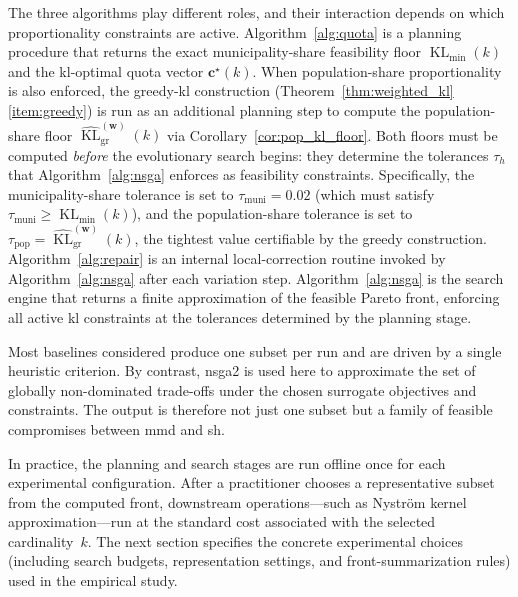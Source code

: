 \documentclass[10pt,journal]{IEEEtran}
\newcommand{\1}{\mathbf{1}}
\newcommand{\bw}{\mathbf{w}}
\newcommand{\bc}{\mathbf{c}}
\DeclareMathOperator{\KL}{KL}
\theoremstyle{ieeethm}
\begin{document}
The three algorithms play different roles, and their interaction depends on which proportionality constraints are active. Algorithm~\ref{alg:quota} is a planning procedure that returns the exact municipality-share feasibility floor $\KL_{\min}(k)$ and the \gls{kl}-optimal quota vector $\bc^\star(k)$. When population-share proportionality is also enforced, the greedy-\gls{kl} construction (Theorem~\ref{thm:weighted_kl}\ref{item:greedy}) is run as an additional planning step to compute the population-share floor $\widehat{\KL}^{(\bw)}_{\mathrm{gr}}(k)$ via Corollary~\ref{cor:pop_kl_floor}. Both floors must be computed \emph{before} the evolutionary search begins: they determine the tolerances $\tau_h$ that Algorithm~\ref{alg:nsga} enforces as feasibility constraints. Specifically, the municipality-share tolerance is set to $\tau_{\mathrm{muni}}=0.02$ (which must satisfy $\tau_{\mathrm{muni}}\ge\KL_{\min}(k)$), and the population-share tolerance is set to $\tau_{\mathrm{pop}}=\widehat{\KL}^{(\bw)}_{\mathrm{gr}}(k)$, the tightest value certifiable by the greedy construction. Algorithm~\ref{alg:repair} is an internal local-correction routine invoked by Algorithm~\ref{alg:nsga} after each variation step. Algorithm~\ref{alg:nsga} is the search engine that returns a finite approximation of the feasible Pareto front, enforcing all active \gls{kl} constraints at the tolerances determined by the planning stage.

Most baselines considered produce one subset per run and are driven by a single heuristic criterion. By contrast, \gls{nsga2} is used here to approximate the set of globally non-dominated trade-offs under the chosen surrogate objectives and constraints. The output is therefore not just one subset but a family of feasible compromises between \gls{mmd} and \gls{sh}.

In practice, the planning and search stages are run offline once for each experimental configuration. After a practitioner chooses a representative subset from the computed front, downstream operations---such as Nyström kernel approximation---run at the standard cost associated with the selected cardinality~$k$. The next section specifies the concrete experimental choices (including search budgets, representation settings, and front-summarization rules) used in the empirical study.

\endgroup

\end{document}
